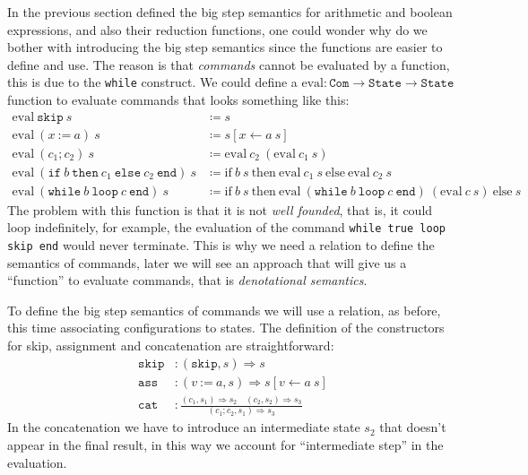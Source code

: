 \documentclass[
  a4paper, 
  10pt, 
  parskip=half, 
  DIV=20,
  toc=bibliography,
  usegeometry,
]{scrartcl}
\newcommand{\funfont}[1]{\text{#1}}
\newcommand{\tyfont}[1]{\texttt{#1}}
\newcommand{\bigstep}{\Longrightarrow}
\begin{document}
In the previous section defined the big step semantics for arithmetic and
boolean expressions, and also their reduction functions, one could wonder
why do we bother with introducing the big step semantics since 
the functions are easier to define and use. The reason is that 
\emph{commands} cannot be evaluated by a function, this is due to the 
\texttt{while} construct. We could define a \(\funfont{eval}: \tyfont{Com} \to \tyfont{State} \to \tyfont{State}\) 
function to evaluate commands that looks something like this:
\begin{align*}
  \funfont{eval} \ \texttt{skip} \ s &\coloneqq s \\
  \funfont{eval} \ (x \ \texttt{:=} \ a) \ s &\coloneqq s[x \leftarrow a \ s] \\
  \funfont{eval} \ (c_1; c_2) \ s &\coloneqq \funfont{eval} \ c_2 \ (\funfont{eval} \ c_1 \ s) \\
  \funfont{eval} \ (\texttt{if} \ b \ \texttt{then} \ c_1 \ \texttt{else} \ c_2 \ \texttt{end}) \ s &\coloneqq
    \text{if} \ b \ s \ \text{then} \ \funfont{eval} \ c_1 \ s \ \text{else} \ \funfont{eval} \ c_2 \ s \\
  \funfont{eval} \ (\texttt{while} \ b \ \texttt{loop} \ c \ \texttt{end}) \ s &\coloneqq
    \text{if} \ b \ s \ \text{then} \ \funfont{eval} \ (\texttt{while} \ b \ \texttt{loop} \ c \ \texttt{end}) \ (\funfont{eval} \ c \ s) \ \text{else} \ s
\end{align*}
The problem with this function is that it is not \emph{well founded}, that is,
it could loop indefinitely, for example, the evaluation of the command
\texttt{while true loop skip end}
would never terminate. This is why we
need a relation to define the semantics of commands, later we will see
an approach that will give us a \enquote{function} to evaluate commands, that
is \emph{denotational semantics}.

To define the big step semantics of commands we will use a relation, as 
before, this time associating configurations to states. The definition of
the constructors for skip, assignment and concatenation are straightforward:
\begin{align*}
  \texttt{skip} &: (\texttt{skip}, s) \bigstep s \\
  \texttt{ass} &: (v \ \texttt{:=} \ a, s) \bigstep s[v \leftarrow a \ s] \\
  \texttt{cat} &: \frac{
    (c_1, s_1) \bigstep s_2 \quad (c_2, s_2) \bigstep s_3
  }{
    (c_1; c_2, s_1) \bigstep s_3
  }
\end{align*}
In the concatenation we have to introduce an intermediate state \(s_2\) that doesn't appear in the
final result, in this way we account for \enquote{intermediate step} in the 
evaluation.
\end{document}
